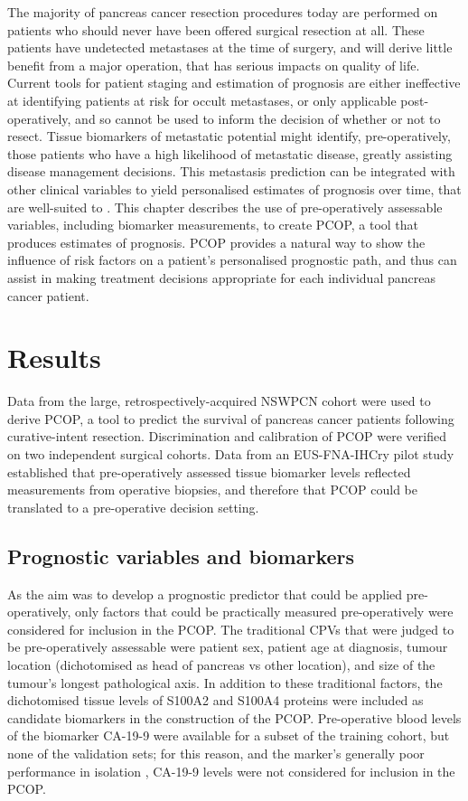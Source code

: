 \documentclass[dissertation.tex]{subfiles}
\begin{document}
The majority of pancreas cancer resection procedures today are performed on patients who should never have been offered surgical resection at all.  These patients have undetected metastases at the time of surgery, and will derive little benefit from a major operation, that has serious impacts on quality of life.  Current tools for patient staging and estimation of prognosis are either ineffective at identifying patients at risk for occult metastases, or only applicable post-operatively, and so cannot be used to inform the decision of whether or not to resect.  Tissue biomarkers of metastatic potential might identify, pre-operatively, those patients who have a high likelihood of metastatic disease, greatly assisting disease management decisions.  This metastasis prediction can be integrated with other clinical variables to yield personalised estimates of prognosis over time, that are well-suited to .  This chapter describes the use of pre-operatively assessable variables, including biomarker measurements, to create \gls{PCOP}, a tool that produces estimates of prognosis.  \Gls{PCOP} provides a natural way to show the influence of risk factors on a patient's personalised prognostic path, and thus can assist in making treatment decisions appropriate for each individual pancreas cancer patient.

\section{Results}
Data from the large, retrospectively-acquired \gls{NSWPCN} cohort were used to derive \gls{PCOP}, a tool to predict the survival of pancreas cancer patients following curative-intent resection.  Discrimination and calibration of \gls{PCOP} were verified on two independent surgical cohorts.  Data from an \gls{EUS}-\gls{FNA}-\acrshort{IHCry} pilot study established that pre-operatively assessed tissue biomarker levels reflected measurements from operative biopsies, and therefore that \gls{PCOP} could be translated to a pre-operative decision setting.

\subsection{Prognostic variables and biomarkers}
As the aim was to develop a prognostic predictor that could be applied pre-operatively, only factors that could be practically measured pre-operatively were considered for inclusion in the \gls{PCOP}.  The traditional \glspl{CPV} that were judged to be pre-operatively assessable were patient sex, patient age at diagnosis, tumour location (dichotomised as head of pancreas vs other location), and size of the tumour's longest pathological axis.  In addition to these traditional factors, the dichotomised tissue levels of S100A2 and S100A4 proteins were included as candidate biomarkers in the construction of the \gls{PCOP}.  Pre-operative blood levels of the biomarker \gls{CA-19-9} were available for a subset of the training cohort, but none of the validation sets; for this reason, and the marker's generally poor performance in isolation \cite{Kim2011}, \gls{CA-19-9} levels were not considered for inclusion in the \gls{PCOP}.
\end{document}
